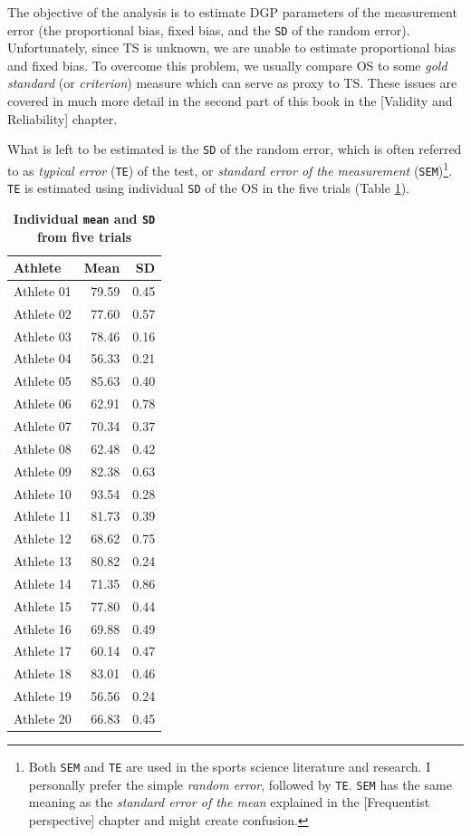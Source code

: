 \documentclass[
]{book}
\begin{document}
The objective of the analysis is to estimate DGP parameters of the measurement error (the proportional bias, fixed bias, and the \texttt{SD} of the random error). Unfortunately, since TS is unknown, we are unable to estimate proportional bias and fixed bias. To overcome this problem, we usually compare OS to some \emph{gold standard} (or \emph{criterion}) measure which can serve as proxy to TS. These issues are covered in much more detail in the second part of this book in the {[}Validity and Reliability{]} chapter.

What is left to be estimated is the \texttt{SD} of the random error, which is often referred to as \emph{typical error} (\texttt{TE}) of the test, or \emph{standard error of the measurement} (\texttt{SEM})\footnote{Both \texttt{SEM} and \texttt{TE} are used in the sports science literature and research. I personally prefer the simple \emph{random error}, followed by \texttt{TE}. \texttt{SEM} has the same meaning as the \emph{standard error of the mean} explained in the {[}Frequentist perspective{]} chapter and might create confusion.}. \texttt{TE} is estimated using individual \texttt{SD} of the OS in the five trials (Table \ref{tab:individual-error}).



\begin{table}

\caption{\label{tab:individual-error}\textbf{Individual \texttt{mean} and \texttt{SD} from five trials}}
\centering
\begin{tabular}[t]{lrr}
\toprule
Athlete & Mean & SD\\
\midrule
Athlete 01 & 79.59 & 0.45\\
Athlete 02 & 77.60 & 0.57\\
Athlete 03 & 78.46 & 0.16\\
Athlete 04 & 56.33 & 0.21\\
Athlete 05 & 85.63 & 0.40\\
\addlinespace
Athlete 06 & 62.91 & 0.78\\
Athlete 07 & 70.34 & 0.37\\
Athlete 08 & 62.48 & 0.42\\
Athlete 09 & 82.38 & 0.63\\
Athlete 10 & 93.54 & 0.28\\
\addlinespace
Athlete 11 & 81.73 & 0.39\\
Athlete 12 & 68.62 & 0.75\\
Athlete 13 & 80.82 & 0.24\\
Athlete 14 & 71.35 & 0.86\\
Athlete 15 & 77.80 & 0.44\\
\addlinespace
Athlete 16 & 69.88 & 0.49\\
Athlete 17 & 60.14 & 0.47\\
Athlete 18 & 83.01 & 0.46\\
Athlete 19 & 56.56 & 0.24\\
Athlete 20 & 66.83 & 0.45\\
\bottomrule
\end{tabular}
\end{table}
\end{document}
